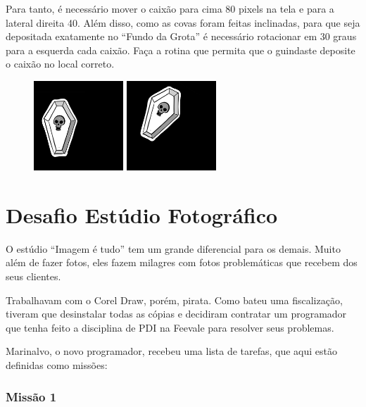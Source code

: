 \documentclass[
	12pt,				%
	oneside,			%
	a4paper,			%
	english,			%
	french,				%
	spanish,			%
	brazil,				%
	]{abntex2}
\begin{document}
\begin{apendicesenv}
Para tanto, é necessário mover o caixão para cima 80 pixels na tela e para a lateral direita 40. Além disso, como as covas foram feitas inclinadas, para que seja depositada exatamente no “Fundo da Grota” é necessário rotacionar em 30 graus para a esquerda cada caixão. Faça a rotina que permita que o guindaste deposite o caixão no local correto.

\begin{figure}[H]
\centering
\includegraphics[width=0.3\textwidth]{imagens/desafios/coffin2d00.jpg}
\includegraphics[width=0.3\textwidth]{imagens/desafios/mission6.png}
\end{figure}


\chapter{Desafio Estúdio Fotográfico}
\label{apen:estudioFotografico}

O estúdio “Imagem é tudo” tem um grande diferencial para os demais. Muito além de fazer fotos, eles fazem milagres com fotos problemáticas que recebem dos seus clientes. 

Trabalhavam com o Corel Draw, porém, pirata. Como bateu uma fiscalização, tiveram que desinstalar todas as cópias e decidiram contratar um programador que tenha feito a disciplina de PDI na Feevale para resolver seus problemas. 

Marinalvo, o novo programador, recebeu uma lista de tarefas, que aqui estão definidas como missões:


\subsection{Missão 1}


\end{apendicesenv}
\end{document}
